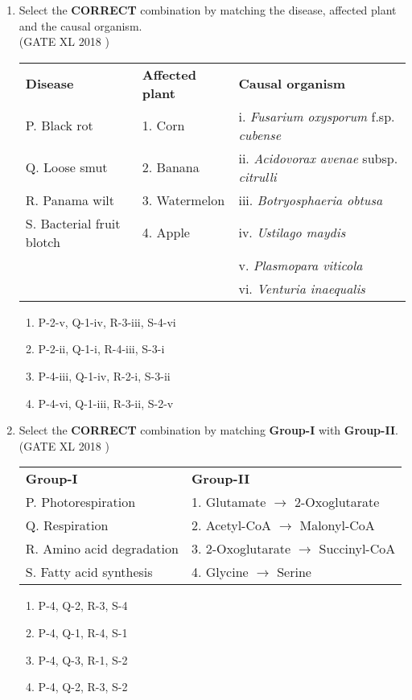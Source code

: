 \documentclass[14pt]{extarticle}
\begin{document}
\begin{flushleft}
\begin{enumerate}[leftmargin=*]
\item  Select the \textbf{CORRECT} combination by matching the disease, affected plant and the causal organism.\\
\hfill(GATE XL 2018 )
\begin{tabular}{p{3.5cm} p{3cm} p{7cm}}
\textbf{Disease} & \textbf{Affected plant} & \textbf{Causal organism} \\
P. Black rot & 1. Corn & i. \textit{Fusarium oxysporum} f.sp. \textit{cubense} \\
Q. Loose smut & 2. Banana & ii. \textit{Acidovorax avenae} subsp. \textit{citrulli} \\
R. Panama wilt & 3. Watermelon & iii. \textit{Botryosphaeria obtusa} \\
S. Bacterial fruit blotch & 4. Apple & iv. \textit{Ustilago maydis} \\
 & & v. \textit{Plasmopara viticola} \\
 & & vi. \textit{Venturia inaequalis} \\
\end{tabular}

\begin{enumerate}
    \item P-2-v, Q-1-iv, R-3-iii, S-4-vi
    \item P-2-ii, Q-1-i, R-4-iii, S-3-i
    \item P-4-iii, Q-1-iv, R-2-i, S-3-ii
    \item P-4-vi, Q-1-iii, R-3-ii, S-2-v
\end{enumerate}

\item Select the \textbf{CORRECT} combination by matching \textbf{Group-I} with \textbf{Group-II}.\\
\hfill(GATE XL 2018 )
\begin{tabular}{p{5cm} p{6cm}}
\textbf{Group-I} & \textbf{Group-II} \\
P. Photorespiration & 1. Glutamate $\rightarrow$ 2-Oxoglutarate \\
Q. Respiration & 2. Acetyl-CoA $\rightarrow$ Malonyl-CoA \\
R. Amino acid degradation & 3. 2-Oxoglutarate $\rightarrow$ Succinyl-CoA \\
S. Fatty acid synthesis & 4. Glycine $\rightarrow$ Serine \\
\end{tabular}

\begin{enumerate}
    \item P-4, Q-2, R-3, S-4
    \item P-4, Q-1, R-4, S-1
    \item P-4, Q-3, R-1, S-2
    \item P-4, Q-2, R-3, S-2
\end{enumerate}


\end{enumerate}
\end{flushleft}
\end{document}

